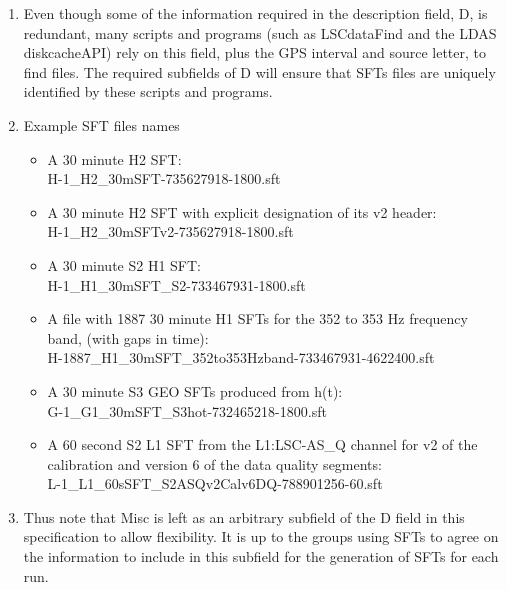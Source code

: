 \documentclass{ligodcc}
\begin{document}
\begin{enumerate}
\begin{enumerate}
\item Even though some of the information required in the description
field, D, is redundant, many scripts and programs (such as LSCdataFind
and the LDAS diskcacheAPI) rely on this field, plus the GPS interval and
source letter, to find files. The required subfields of D will ensure
that SFTs files are uniquely identified by these scripts and programs.

\item Example SFT files names
\begin{itemize}
\item A 30 minute H2 SFT:\\
   H-1\_H2\_30mSFT-735627918-1800.sft
\item A 30 minute H2 SFT with explicit designation of its v2 header:\\
   H-1\_H2\_30mSFTv2-735627918-1800.sft
\item A 30 minute S2 H1 SFT:\\
   H-1\_H1\_30mSFT\_S2-733467931-1800.sft
\item A file with 1887 30 minute H1 SFTs for the 352 to 353 Hz frequency band, (with gaps in time):\\
   H-1887\_H1\_30mSFT\_352to353Hzband-733467931-4622400.sft
\item A 30 minute S3 GEO SFTs produced from h(t):\\
   G-1\_G1\_30mSFT\_S3hot-732465218-1800.sft
\item A 60 second S2 L1 SFT from the L1:LSC-AS\_Q channel for v2 of the calibration and version 
  6 of the data quality segments:\\
   L-1\_L1\_60sSFT\_S2ASQv2Calv6DQ-788901256-60.sft
\end{itemize}

\item Thus note that Misc is left as an arbitrary subfield of the D field
in this specification to allow flexibility.  It is up to the groups
using SFTs to agree on the information to include in this subfield for
the generation of SFTs for each run.
\end{enumerate}
\end{enumerate}
\end{document}
